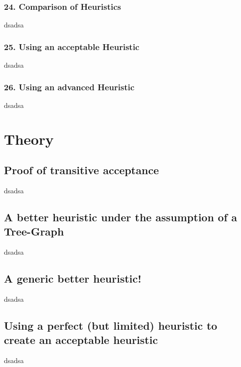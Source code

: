 \documentclass{article}
\begin{document}
\subsubsection*{24. Comparison of Heuristics}
dsadsa

\subsubsection*{25. Using an acceptable Heuristic}
dsadsa

\subsubsection*{26. Using an advanced Heuristic}
dsadsa

\section {Theory}
\subsection*{Proof of transitive acceptance}
dsadsa

\subsection*{A better heuristic under the assumption of a Tree-Graph}
dsadsa

\subsection*{A generic better heuristic!}
dsadsa

\subsection*{Using a perfect (but limited) heuristic to create an acceptable heuristic}
dsadsa
\end{document}

